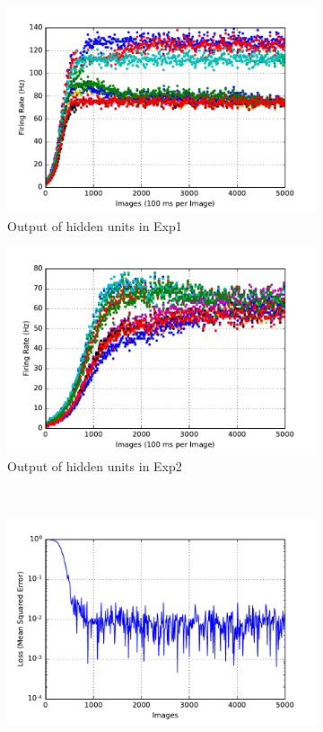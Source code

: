\begin{figure}
\begin{subfigure}[t]{0.4\textwidth}
		\includegraphics[width=\textwidth]{pics_sdlm/05_exp_SAE_teach_long/exp1_hid_s.pdf}
		\caption{Output of hidden units in Exp1}
	\end{subfigure}
	\begin{subfigure}[t]{0.4\textwidth}
		\includegraphics[width=\textwidth]{pics_sdlm/05_exp_SAE_teach_long/exp2_hid_s.pdf}
		\caption{Output of hidden units in Exp2}
	\end{subfigure}\\
	\begin{subfigure}[t]{0.4\textwidth}
		\includegraphics[width=\textwidth]{pics_sdlm/05_exp_SAE_teach_long/exp1_mse_nons.pdf}

\end{subfigure}
\end{figure}
